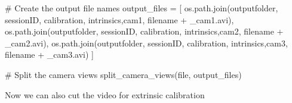 \documentclass[
  letterpaper,
  DIV=11,
  numbers=noendperiod]{scrreprt}
\newenvironment{Shaded}{\begin{snugshade}}{\end{snugshade}}
\newcommand{\BuiltInTok}[1]{\textcolor[rgb]{0.00,0.23,0.31}{#1}}
\newcommand{\CommentTok}[1]{\textcolor[rgb]{0.37,0.37,0.37}{#1}}
\newcommand{\NormalTok}[1]{\textcolor[rgb]{0.00,0.23,0.31}{#1}}
\newcommand{\OperatorTok}[1]{\textcolor[rgb]{0.37,0.37,0.37}{#1}}
\newcommand{\StringTok}[1]{\textcolor[rgb]{0.13,0.47,0.30}{#1}}
\begin{document}
\begin{Shaded}
\begin{Highlighting}[]
    \CommentTok{\# Create the output file names}
\NormalTok{    output\_files }\OperatorTok{=}\NormalTok{ [}
\NormalTok{        os.path.join(outputfolder, sessionID, }\StringTok{\textquotesingle{}calibration\textquotesingle{}}\NormalTok{, }\StringTok{\textquotesingle{}intrinsics\textquotesingle{}}\NormalTok{,}\StringTok{\textquotesingle{}cam1\textquotesingle{}}\NormalTok{, filename }\OperatorTok{+} \StringTok{\textquotesingle{}\_cam1.avi\textquotesingle{}}\NormalTok{),}
\NormalTok{        os.path.join(outputfolder, sessionID, }\StringTok{\textquotesingle{}calibration\textquotesingle{}}\NormalTok{, }\StringTok{\textquotesingle{}intrinsics\textquotesingle{}}\NormalTok{,}\StringTok{\textquotesingle{}cam2\textquotesingle{}}\NormalTok{, filename }\OperatorTok{+} \StringTok{\textquotesingle{}\_cam2.avi\textquotesingle{}}\NormalTok{),}
\NormalTok{        os.path.join(outputfolder, sessionID, }\StringTok{\textquotesingle{}calibration\textquotesingle{}}\NormalTok{, }\StringTok{\textquotesingle{}intrinsics\textquotesingle{}}\NormalTok{,}\StringTok{\textquotesingle{}cam3\textquotesingle{}}\NormalTok{, filename }\OperatorTok{+} \StringTok{\textquotesingle{}\_cam3.avi\textquotesingle{}}\NormalTok{)}
\NormalTok{    ]}
    
    \CommentTok{\# Split the camera views}
\NormalTok{    split\_camera\_views(}\BuiltInTok{file}\NormalTok{, output\_files)}
\end{Highlighting}
\end{Shaded}

Now we can also cut the video for extrinsic calibration
\end{document}
